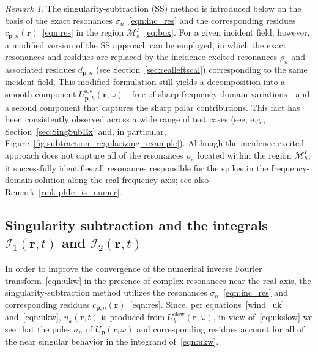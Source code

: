 \documentclass[11pt]{article}
\theoremstyle{plain}
\theoremstyle{remark}
\newtheorem{remark}{Remark}
\def \br{\mathbf{r}}
\def \bp{\mathbf{p}}
\begin{document}
\begin{remark}\label{rmk:using_true_pols}
  The singularity-subtraction (SS) method is introduced below on the
  basis of the exact resonances $\sigma_n$~\eqref{eqn:inc_res} and the
  corresponding residues $c_{\bp,n}(\br)$~\eqref{eqn:res} in the
  region $\mathcal{M}_h^I$~\eqref{eq:box}.  For a given incident
  field, however, a modified version of the SS approach can be
  employed, in which the exact resonances and residues are replaced by
  the incidence-excited resonances $\rho_n$ and associated residues
  $d_{\bp,n}$ (see Section~\ref{sec:realleftscal}) corresponding to
  the same incident field.  This modified formulation still yields a
  decomposition into a smooth component
  $U_{\bp,h}^{\mathrm{s,e}}(\br,\omega)$---free of sharp
  frequency-domain variations---and a second component that captures
  the sharp polar contributions.  This fact has been consistently
  observed across a wide range of test cases (see, e.g.,
  Section~\ref{sec:SingSubEx} and, in particular,
  Figure~\ref{fig:subtraction_regularizing_example}).  Although the
  incidence-excited approach does not capture all of the resonances
  $\rho_n$ located within the region $\mathcal{M}_h^I$, it
  successfully identifies all resonances responsible for the spikes in
  the frequency-domain solution along the real frequency axis; see
  also Remark~\ref{rmk:phIe_is_numer}.
\end{remark}



\subsection{Singularity subtraction and the integrals
  $\mathcal{I}_{1}(\br,t)$ and
  $\mathcal{I}_{2}(\br,t)$}\label{sec:SingSubIntrod}
In order to improve the convergence of the numerical inverse Fourier
transform~\eqref{eqn:ukw} in the presence of complex resonances near
the real axis, the singularity-subtraction method utilizes the resonances $\sigma_n$~\eqref{eqn:inc_res} and corresponding residues $c_{\bp,n}(\br)$~\eqref{eqn:res}. Since, per equations~\eqref{wind_uk}
and~\eqref{eqn:ukw}, $u_k(\br,t)$ is produced from
$U^\mathrm{slow}_k(\br,\omega)$, in view of~\eqref{eq:ukslow} we see
that the poles $\sigma_n$ of $U_{\bp}(\br,\omega)$ and corresponding residues
account for all of the near singular behavior in the integrand
of~\eqref{eqn:ukw}.
\end{document}
